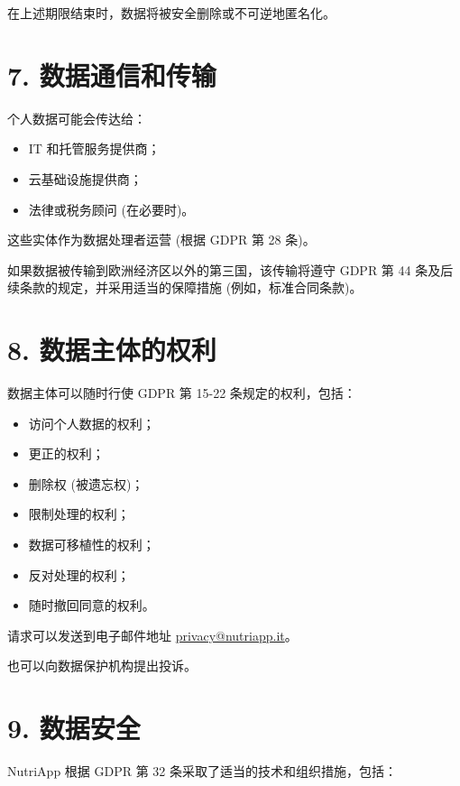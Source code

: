 \documentclass[a4paper,12pt]{article}
\begin{document}
    在上述期限结束时，数据将被安全删除或不可逆地匿名化。

    \section*{7. 数据通信和传输}

    个人数据可能会传达给：

    \begin{itemize}
        \item IT 和托管服务提供商；
        \item 云基础设施提供商；
        \item 法律或税务顾问 (在必要时)。
    \end{itemize}

    这些实体作为数据处理者运营 (根据 GDPR 第 28 条)。

    如果数据被传输到欧洲经济区以外的第三国，该传输将遵守 GDPR 第 44 条及后续条款的规定，并采用适当的保障措施 (例如，标准合同条款)。

    \section*{8. 数据主体的权利}

    数据主体可以随时行使 GDPR 第 15-22 条规定的权利，包括：

    \begin{itemize}
        \item 访问个人数据的权利；
        \item 更正的权利；
        \item 删除权 (被遗忘权)；
        \item 限制处理的权利；
        \item 数据可移植性的权利；
        \item 反对处理的权利；
        \item 随时撤回同意的权利。
    \end{itemize}

    请求可以发送到电子邮件地址 \href{mailto:privacy@nutriapp.it}{privacy@nutriapp.it}。

    也可以向数据保护机构提出投诉。

    \section*{9. 数据安全}

    NutriApp 根据 GDPR 第 32 条采取了适当的技术和组织措施，包括：
\end{document}
